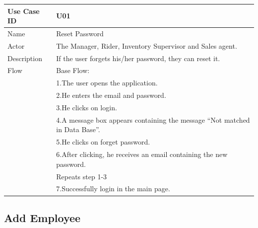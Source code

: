 \documentclass[12pt]{article}
\begin{document}
\begin{table}[H]
\begin{tabular}{|l|l|}
\hline
Use Case ID & U01                                                                        \\ \hline
Name        & Reset Password                                                             \\ \hline
Actor       & The Manager, Rider, Inventory Supervisor and Sales agent.                  \\ \hline
Description & If the user forgets his/her password, they can reset it.                   \\ \hline
Flow        & Base Flow:                                                                 \\
            & 1.The user opens the application.                                          \\
            & 2.He enters the email and password.                                        \\
            & 3.He clicks on login.                                                      \\
            & 4.A message box appears containing the message “Not matched in Data Base”. \\
            & 5.He clicks on forget password.                                            \\
            & 6.After clicking, he receives an email containing the new password.        \\
            & Repeats step 1-3                                                           \\
            & 7.Successfully login in the main page.                                     \\ \hline
\end{tabular}
\end{table}

\subsection{Add Employee}
\end{document}
